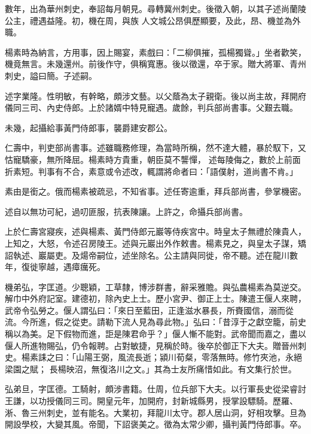 \begin{pinyinscope}
 數年，出為華州刺史，奉詔每月朝見。尋轉冀州刺史。後徵入朝，以其子述尚蘭陵公主，禮遇益隆。初，機在周，與族
 人文城公昂俱歷顯要，及此，昂、機並為外職。



 楊素時為納言，方用事，因上賜宴，素戲曰：「二柳俱摧，孤楊獨聳。」坐者歡笑，機竟無言。未幾還州。前後作守，俱稱寬惠。後以徵還，卒于家。贈大將軍、青州刺史，謚曰簡。子述嗣。



 述字業隆。性明敏，有幹略，頗涉文藝。以父蔭為太子親衛。後以尚主故，拜開府儀同三司、內史侍郎。上於諸婿中特見寵遇。歲餘，判兵部尚書事。父艱去職。



 未幾，起攝給事黃門侍郎事，襲爵建安郡公。



 仁壽中，判吏部尚書事。述雖職務修理，為當時所稱，然不達大體，暴於馭下，又怙寵驕豪，無所降屈。楊素時方貴重，朝臣莫不讋憚，
 述每陵侮之，數於上前面折素短。判事有不合，素意或令述改，輒謂將命者曰：「語僕射，道尚書不肯。」



 素由是銜之。俄而楊素被疏忌，不知省事。述任寄逾重，拜兵部尚書，參掌機密。



 述自以無功可紀，過叨匪服，抗表陳讓。上許之，命攝兵部尚書。



 上於仁壽宮寢疾，述與楊素、黃門侍郎元巖等侍疾宮中。時皇太子無禮於陳貴人，上知之，大怒，令述召房陵王。述與元巖出外作敕書。楊素見之，與皇太子謀，矯詔執述、巖屬吏。及煬帝嗣位，述坐除名。公主請與同徙，帝不聽。述在龍川數年，復徙寧越，遇瘴癘死。



 機弟弘，字匡道。少聰穎，工草隸，博涉群書，辭采雅贍。與弘農楊素為莫逆交。解巾中外府記室。建德初，除內史上士。歷小宮尹、御正上士。陳遣王偃人來聘，武帝令弘勞之。偃人謂弘曰：「來日至藍田，正逢滋水暴長，所賚國信，溺而從流。今所進，假之從吏。請勒下流人見為尋此物。」弘曰：「昔淳于之獻空籠，前史稱以為美。足下假物而進，詎是陳君命乎？」偃人慚不能對。武帝聞而嘉之，盡以偃人所進物賜弘，仍令報聘。占對敏捷，見稱於時。後卒於御正下大夫。贈晉州刺史。楊素誄之曰：「山陽王弼，風流長逝；潁川荀粲，零落無時。修竹夾池，永絕梁園之賦；
 長楊映沼，無復洛川之文。」其為士友所痛惜如此。有文集行於世。



 弘弟旦，字匡德。工騎射，頗涉書籍。仕周，位兵部下大夫。以行軍長史從梁睿討王謙，以功授儀同三司。開皇元年，加開府，封新城縣男，授掌設驃騎。歷羅、淅、魯三州刺史，並有能名。大業初，拜龍川太守。郡人居山洞，好相攻擊。旦為開設學校，大變其風。帝聞，下詔褒美之。徵為太常少卿，攝判黃門侍郎事。卒。




\end{pinyinscope}
